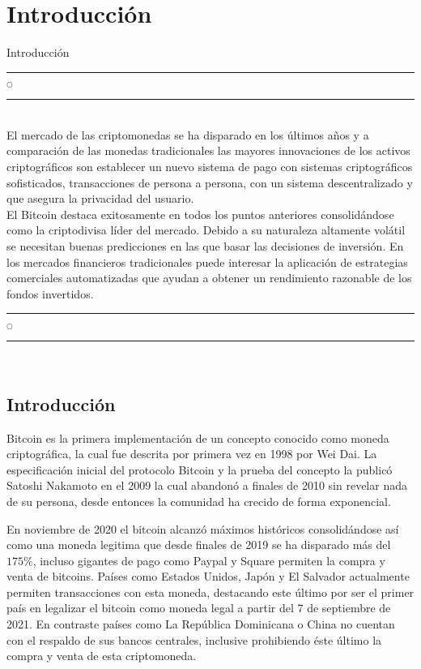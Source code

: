 \chapter[Introducción]{Introducción}{Introducción}\label{Intro}
\noindent
\rule{0.49\textwidth}{0.75pt} $_{\bigcirc}$ \rule{0.49\textwidth}{0.75pt}\\

El mercado de las criptomonedas se ha disparado en los últimos años y a comparación  de las monedas tradicionales las mayores innovaciones de los activos criptográficos son establecer un nuevo sistema de pago con sistemas criptográficos sofisticados, transacciones de persona a persona, con un sistema descentralizado y que asegura la privacidad del usuario.\\
El Bitcoin destaca exitosamente en todos los puntos anteriores consolidándose como la criptodivisa líder del mercado.
Debido a su naturaleza altamente volátil se necesitan buenas predicciones en las que basar las decisiones de inversión. En los mercados financieros tradicionales puede interesar la aplicación de estrategias comerciales automatizadas que ayudan a obtener un rendimiento razonable de los fondos invertidos.\\

\noindent
\rule{0.49\textwidth}{0.75pt} $_{\bigcirc}$ \rule{0.49\textwidth}{0.75pt}\\
\clearpage

\section{Introducción}
Bitcoin es la primera implementación de un concepto conocido como moneda criptográfica, la cual fue descrita por primera vez en 1998 por Wei Dai. La especificación inicial del protocolo Bitcoin y la prueba del concepto la publicó Satoshi Nakamoto en el 2009 \cite{nakamotoBitcoinPeertoPeerElectronic} la cual abandonó a finales de 2010 sin revelar nada de su persona, desde entonces la comunidad ha crecido de forma exponencial.

En noviembre de 2020 el bitcoin alcanzó máximos históricos \cite{BitcoinUSDBTCUSD} consolidándose así como una moneda legitima que desde finales de 2019 se ha disparado más del $175\%$, incluso gigantes de pago como Paypal y Square permiten la compra y venta de bitcoins. Países como Estados Unidos, Japón y El Salvador actualmente permiten transacciones con esta moneda, destacando este último por ser el primer país en legalizar el bitcoin como moneda legal a partir del 7 de septiembre de 2021. En contraste países como La República Dominicana o China no cuentan con el respaldo de sus bancos centrales, inclusive prohibiendo éste último la compra y venta de esta criptomoneda.

